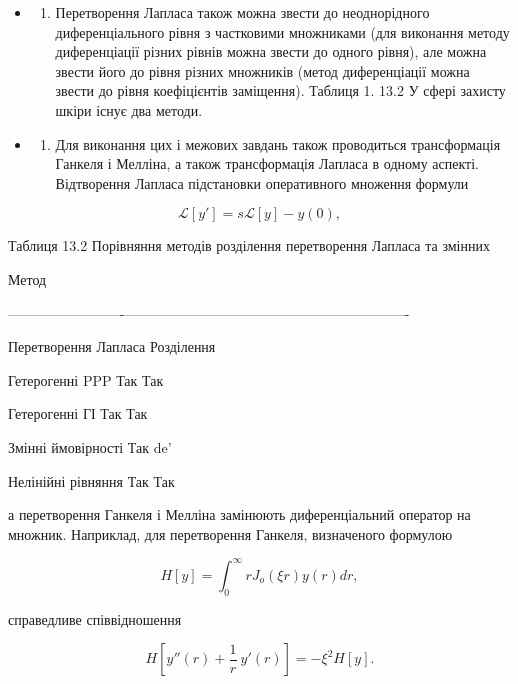 \documentclass[
  ukrainian,
]{article}
\providecommand{\tightlist}{%
  \setlength{\itemsep}{0pt}\setlength{\parskip}{0pt}}
\begin{document}
\begin{itemize}
\tightlist
\item
  \begin{enumerate}
  \def\labelenumi{\arabic{enumi}.}
  \tightlist
  \item
    Перетворення Лапласа також можна звести до неоднорідного
    диференціального рівня з частковими множниками (для виконання методу
    диференціації різних рівнів можна звести до одного рівня), але можна
    звести його до рівня різних множників (метод диференціації можна
    звести до рівня коефіцієнтів заміщення). Таблиця 1. 13.2 У сфері
    захисту шкіри існує два методи.
  \end{enumerate}
\item
  \begin{enumerate}
  \def\labelenumi{\arabic{enumi}.}
  \setcounter{enumi}{1}
  \tightlist
  \item
    Для виконання цих і межових завдань також проводиться трансформація
    Ганкеля і Мелліна, а також трансформація Лапласа в одному аспекті.
    Відтворення Лапласа підстановки оперативного множення формули
  \end{enumerate}
\end{itemize}

\[
\mathscr{L}[y'] = s\mathscr{L}[y] - y(0),
\]

Таблиця 13.2 Порівняння методів розділення перетворення Лапласа та
змінних

\textbar{} Метод \textbar{} \textbar{}

\textbar-------------------------\textbar---------------------------\textbar----------------------------------\textbar{}

\textbar{} Перетворення Лапласа \textbar{} Розділення \textbar{}

Гетерогенні PPP \textbar{} Так \textbar{} Так \textbar{}

Гетерогенні ГІ \textbar{} Так \textbar{} Так \textbar{}

Змінні ймовірності \textbar{} Так \textbar{} de' \textbar{}

Нелінійні рівняння \textbar{} Так \textbar{} Так \textbar{}

а перетворення Ганкеля і Мелліна замінюють диференціальний оператор на
множник. Наприклад, для перетворення Ганкеля, визначеного формулою

\[
H[y] = \int_{0}^{\infty} r J_{o}(\xi r) y(r) dr,
\]

справедливе співвідношення

\[
H\left[y''\left(r\right)+\frac{1}{r}\ y'\left(r\right)\right]=-\xi^{2}H\left[y\right].
\]
\end{document}
